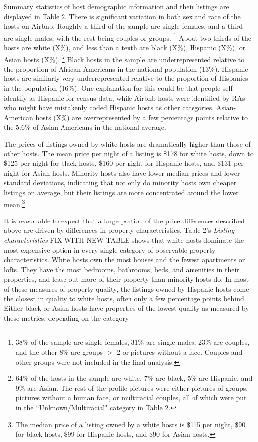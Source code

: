 Summary statistics of host demographic information and their listings are displayed in Table 2. There is significant variation in both sex and race of the hosts on Airbnb. Roughly a third of the sample are single females, and a third are single males, with the rest being couples or groups.%
	\footnote{38\% of the sample are single females, 31\% are single males, 23\% are couples, and the other 8\% are groups $>$ 2 or pictures without a face. Couples and other groups were not included in the final analysis.} 
About two-thirds of the hosts are white (X\%), and less than a tenth are black (X\%), Hispanic (X\%), or Asian hosts (X\%).%
	\footnote{64\% of the hosts in the sample are white, 7\% are black, 5\% are Hispanic, and 9\% are Asian. The rest of the profile pictures were either pictures of groups, pictures without a human face, or multiracial couples, all of which were put in the ``Unknown/Multiracial" category in Table 2.} 
Black hosts in the sample are underrepresented relative to the proportion of African-Americans in the national population (13\%). Hispanic hosts are similarly very underrepresented relative to the proportion of Hispanics in the population (16\%). One explanation for this could be that people self-identify as Hispanic for census data, while Airbnb hosts were identified by RAs who might have mistakenly coded Hispanic hosts as other categories. Asian-American hosts (X\%) are overrepresented by a few percentage points relative to the 5.6\% of Asian-Americans in the national average.\cite{census} 

The prices of listings owned by white hosts are dramatically higher than those of other hosts. The mean price per night of a listing is \$178 for white hosts, down to \$125 per night for black hosts, \$160 per night for Hispanic hosts, and \$131 per night for Asian hosts. Minority hosts also have lower median prices and lower standard deviations, indicating that not only do minority hosts own cheaper listings on average, but their listings are more concentrated around the lower mean.\footnote{The median price of a listing owned by a white hosts is \$115 per night, \$90 for black hosts, \$99 for Hispanic hosts, and \$90 for Asian hosts.} 

It is reasonable to expect that a large portion of the price differences described above are driven by differences in property characteristics. Table 2's \textit{Listing characteristics} FIX WITH NEW TABLE shows that white hosts dominate the most expensive option in every single category of observable property characteristics. White hosts own the most houses and the fewest apartments or lofts. They have the most bedrooms, bathrooms, beds, and amenities in their properties, and lease out more of their property than minority hosts do. In most of these measures of property quality, the listings owned by Hispanic hosts come the closest in quality to white hosts, often only a few percentage points behind. Either black or Asian hosts have properties of the lowest quality as measured by these metrics, depending on the category. 


